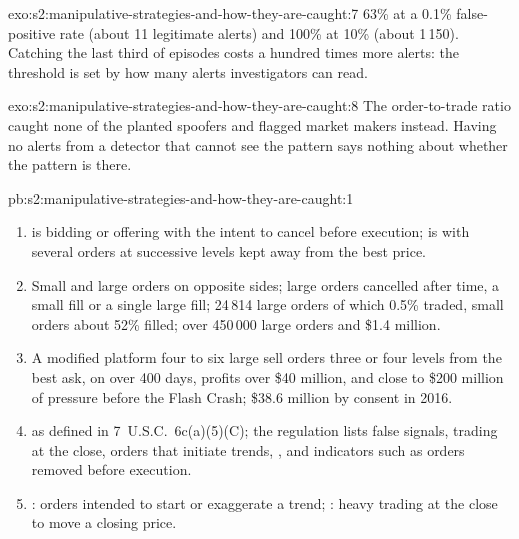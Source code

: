 \begin{solution}{exo:s2:manipulative-strategies-and-how-they-are-caught:7}
63\% at a 0.1\% false-positive rate (about 11 legitimate alerts) and 100\% at 10\% (about 1\,150). Catching the last third of episodes costs a hundred
times more alerts: the threshold is set by how many alerts investigators can read.
\end{solution}

\begin{solution}{exo:s2:manipulative-strategies-and-how-they-are-caught:8}
The order-to-trade ratio caught none of the planted spoofers and flagged market makers instead. Having no alerts from a detector that cannot see the
pattern says nothing about whether the pattern is there.
\end{solution}

\begin{solution}{pb:s2:manipulative-strategies-and-how-they-are-caught:1}
\begin{enumerate}
\item {} is bidding or offering with the intent to cancel before execution;  is  with several orders at successive levels kept
away from the best price.
\item Small and large orders on opposite sides; large orders cancelled after time, a small fill or a single large fill; 24\,814 large orders of which
0.5\% traded, small orders about 52\% filled; over 450\,000 large orders and \$1.4 million.
\item A modified platform  four to six large sell orders three or four levels from the best ask, on over 400 days, profits over \$40 million,
and close to \$200 million of pressure before the Flash Crash; \$38.6 million by consent in 2016.
\item {} as defined in 7~U.S.C.~6c(a)(5)(C); the regulation lists false signals, trading at the close, orders that initiate trends, , and indicators such as orders removed before execution.
\item {}: orders intended to start or exaggerate a trend; : heavy trading at the close to move a closing price.

\end{enumerate}
\end{solution}
